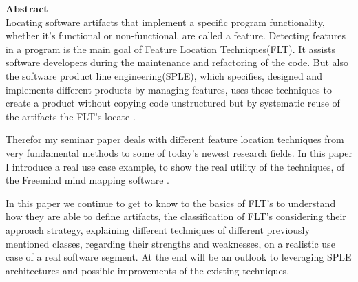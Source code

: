 \vspace*{2cm}

{\bf\Large Abstract} \\ [1em]
Locating software artifacts that implement a specific program functionality, whether it's functional or non-functional, are called a feature. Detecting features in a program is the main goal of Feature Location Techniques(FLT). It assists software developers during the maintenance and refactoring of the code.
But also the software product line engineering(SPLE), which specifies, designed and implements different products by managing features, uses these techniques to create a product without copying code unstructured but by systematic reuse of the artifacts the FLT's locate \cite{pohl2005software}.

Therefor my seminar paper deals with different feature location techniques from very fundamental methods to some of today's newest research fields. In this paper I introduce a real use case example, to show the real utility of the techniques, of the Freemind mind mapping software \cite{FrM16}.

In this paper we continue to get to know to the basics of FLT's to understand how they are able to define artifacts, the classification of FLT's considering their approach strategy, explaining different techniques of different previously mentioned classes, regarding their strengths and weaknesses, on a realistic use case of a real software segment.
At the end will be an outlook to leveraging SPLE architectures and possible improvements of the existing techniques\cite{zhao2006sniafl}.

\cleardoublepage

